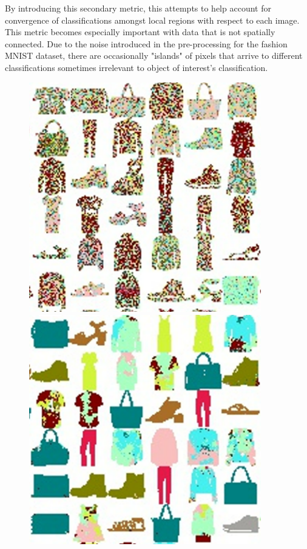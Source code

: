 \documentclass[conference]{IEEEtran}
\begin{document}
By introducing this secondary metric, this attempts to help account for convergence of classifications amongst local regions with respect to each image. This metric becomes especially important with data that is not spatially connected. Due to the noise introduced in the pre-processing for the fashion MNIST dataset, there are occasionally "islands" of pixels that arrive to different classifications sometimes irrelevant to object of interest's classification.

\begin{figure}
    \centering
    \begin{minipage}{0.24\textwidth}
        \centering
        \includegraphics[width=0.9\textwidth]{resources/ep100_class.png} %
    \end{minipage}\hfill
    \begin{minipage}{0.24\textwidth}
        \centering
        \includegraphics[width=0.9\textwidth]{resources/ep100000_class.png} %

\end{minipage}
\end{figure}
\end{document}
